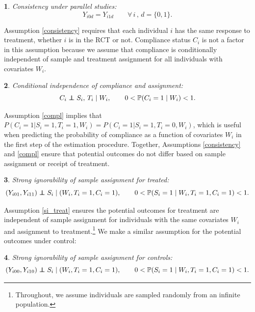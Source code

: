 \documentclass[hidelinks,12pt]{article}
\makeatletter
\newtheorem*{assumption*}{\assumptionnumber}
\providecommand{\assumptionnumber}{}
\newenvironment{assumption}[2]
 {%
  \renewcommand{\assumptionnumber}{Assumption #1}%
  \begin{assumption*}%
  \protected@edef\@currentlabel{#1}%
 }
 {%
  \end{assumption*}
 }
\newcommand{\pr}{\mathbb{P}} %
\newcommand\independent{\protect\mathpalette{\protect\independenT}{\perp}}
\def\independenT#1#2{\mathrel{\rlap{$#1#2$}\mkern2mu{#1#2}}}
\makeatother
\begin{document}
\vskip 0.2in
\begin{assumption}{1}{}\label{consistency}
	Consistency under parallel studies:
	\begin{equation*}
	Y_{i0d} = Y_{i1d} \qquad \forall \, i \, , \, d=\{0,1\}.
	\end{equation*}
\end{assumption} 

\noindent Assumption \eqref{consistency} requires that each individual $i$ has the same response to treatment, whether $i$ is in the RCT or not. Compliance status $C_i$ is not a factor in this assumption because we assume that compliance is conditionally independent of sample and treatment assignment for all individuals with covariates $W_i$.
	
\vskip 0.2in
\begin{assumption}{2}{}\label{compl}
	Conditional independence of compliance and assignment:
	\begin{equation*}
	C_i \independent S_i,\,T_i \mid W_i, \qquad 0 < \pr(C_i = 1 \mid W_i) < 1. 
	\end{equation*}
\end{assumption}

\noindent Assumption \eqref{compl} implies that $P(C_i=1 | S_i=1, T_i=1, W_i) = P(C_i=1 | S_i=1, T_i=0, W_i)$, which is useful when predicting the probability of compliance as a function of covariates $W_i$ in the first step of the estimation procedure. Together, Assumptions \eqref{consistency} and \eqref{compl} ensure that potential outcomes do not differ based on sample assignment or receipt of treatment.

\vskip 0.2in
\begin{assumption}{3}{}\label{si_treat}
	Strong ignorability of sample assignment for treated:
	\begin{equation*}
		(Y_{i01}, Y_{i11}) \independent S_i \mid (W_i, T_i=1,C_i=1), \qquad 0 < \pr(S_i=1 \mid W_i, T_i=1,C_i=1) <1.
	\end{equation*}
\end{assumption}

\noindent Assumption \eqref{si_treat} ensures the potential outcomes for treatment are independent of sample assignment for individuals with the same covariates $W_i$ and assignment to treatment.\footnote{Throughout, we assume individuals are sampled randomly from an infinite population.} We make a similar assumption for the potential outcomes under control: 

\vskip 0.2in
\begin{assumption}{4}{}\label{si_ctrl}
	Strong ignorability of sample assignment for controls:
	\begin{equation*}
		(Y_{i00}, Y_{i10}) \independent S_i \mid (W_i, T_i=1,C_i= 1), \qquad 0 < \pr(S_i=1 \mid W_i, T_i=1,C_i=1) <1. 
\end{equation*}\end{assumption}
\end{document}
